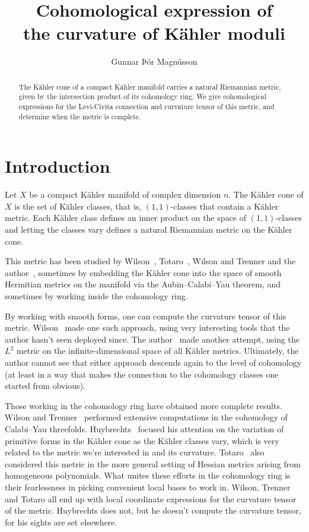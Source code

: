 \documentclass[11pt,a4paper]{amsart}
\title[Curvature of K\"ahler moduli]%
{Cohomological expression of\\
the curvature of K\"{a}hler moduli}
\author{Gunnar Þór Magnússon}
\theoremstyle{definition}
\theoremstyle{remark}
\begin{document}
\begin{abstract}
The K\"{a}hler cone of a compact K\"ahler manifold carries a natural Riemannian
metric, given by the intersection product of its cohomology ring. We give
cohomological expressions for the Levi-Civita connection and curvature tensor of
this metric, and determine when the metric is complete.
\end{abstract}

\maketitle



\section*{Introduction}

Let $X$ be a compact K\"{a}hler manifold of complex dimension $n$. The K\"{a}hler
cone of $X$ is the set of K\"{a}hler classes, that is, $(1,1)$-classes that contain
a K\"{a}hler metric. Each K\"{a}hler class defines an inner product on the space of
$(1,1)$-classes and letting the classes vary defines a natural Riemannian metric
on the K\"{a}hler cone. 

This metric has been studied by Wilson~\cite{Wilson}, Totaro~\cite{totaro},
Wilson and Trenner \cite{WilsonTrenner} and the author~\cite{Magnusson},
sometimes by embedding the K\"{a}hler cone into the space of smooth Hermitian
metrics on the manifold via the Aubin--Calabi--Yau theorem, and sometimes by
working inside the cohomology ring.

By working with smooth forms, one can compute the curvature tensor of this
metric. Wilson~\cite{Wilson} made one such approach, using very interesting
tools that the author hasn't seen deployed since. The author~\cite{Magnusson}
made another attempt, using the $L^2$ metric on the infinite-dimensional space
of all K\"ahler metrics. Ultimately, the author cannot see that either approach
descends again to the level of cohomology (at least in a way that makes the
connection to the cohomology classes one started from obvious).

Those working in the cohomology ring have obtained more complete results.
Wilson and Trenner~\cite{WilsonTrenner} performed extensive computations in the
cohomology of Calabi--Yau threefolds. Huybrechts~\cite{Huybrechts} focused his
attention on the variation of primitive forms in the K\"{a}hler cone as the K\"{a}hler
classes vary, which is very related to the metric we're interested in and its
curvature. Totaro~\cite{totaro} also considered this metric in the more general
setting of Hessian metrics arising from homogeneous polynomials.  What unites
these efforts in the cohomology ring is their fearlessness in picking convenient
local bases to work in. Wilson, Trenner and Totaro all end up with local
coordinate expressions for the curvature tensor of the metric. Huybrechts does
not, but he doesn't compute the curvature tensor, for his sights are set
elsewhere.
\end{document}
